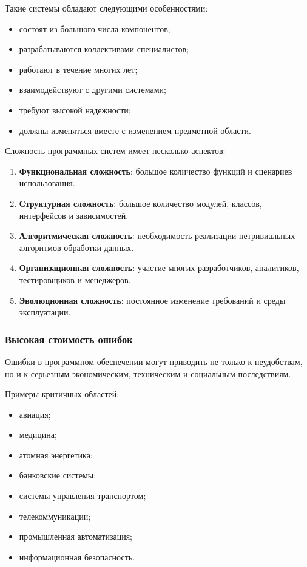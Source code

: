\documentclass[12pt,a4paper]{article}
\begin{document}
Такие системы обладают следующими особенностями:

\begin{itemize}
    \item состоят из большого числа компонентов;
    \item разрабатываются коллективами специалистов;
    \item работают в течение многих лет;
    \item взаимодействуют с другими системами;
    \item требуют высокой надежности;
    \item должны изменяться вместе с изменением предметной области.
\end{itemize}

Сложность программных систем имеет несколько аспектов:

\begin{enumerate}
    \item \textbf{Функциональная сложность}: большое количество функций и сценариев использования.
    \item \textbf{Структурная сложность}: большое количество модулей, классов, интерфейсов и зависимостей.
    \item \textbf{Алгоритмическая сложность}: необходимость реализации нетривиальных алгоритмов обработки данных.
    \item \textbf{Организационная сложность}: участие многих разработчиков, аналитиков, тестировщиков и менеджеров.
    \item \textbf{Эволюционная сложность}: постоянное изменение требований и среды эксплуатации.
\end{enumerate}

\subsubsection{Высокая стоимость ошибок}

Ошибки в программном обеспечении могут приводить не только к неудобствам, но и к серьезным экономическим, техническим и социальным последствиям.

Примеры критичных областей:

\begin{itemize}
    \item авиация;
    \item медицина;
    \item атомная энергетика;
    \item банковские системы;
    \item системы управления транспортом;
    \item телекоммуникации;
    \item промышленная автоматизация;
    \item информационная безопасность.
\end{itemize}
\end{document}
